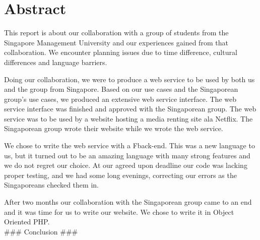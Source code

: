 \section*{Abstract}
This report is about our collaboration with a group of students from the Singapore Management University and our experiences gained from that collaboration. We encounter planning issues due to time difference, cultural differences and language barriers.

Doing our collaboration, we were to produce a web service to be used by both us and the group from Singapore. Based on our use cases and the Singaporean group's use cases, we produced an extensive web service interface. The web service interface was finished and approved with the Singaporean group.
The web service was to be used by a website hosting a media renting site ala Netflix. The Singaporean group wrote their website while we wrote the web service.

We chose to write the web service with a F\Sh back-end. This was a new language to us, but it turned out to be an amazing language with many strong features and we do not regret our choice.
At our agreed upon deadline our code was lacking proper testing, and we had some long evenings, correcting our errors as the Singaporeans checked them in.

After two months our collaboration with the Singaporean group came to an end and it was time for us to write our website. We chose to write it in Object Oriented PHP.
\newline
\\
\#\#\# Conclusion \#\#\# 
\newpage